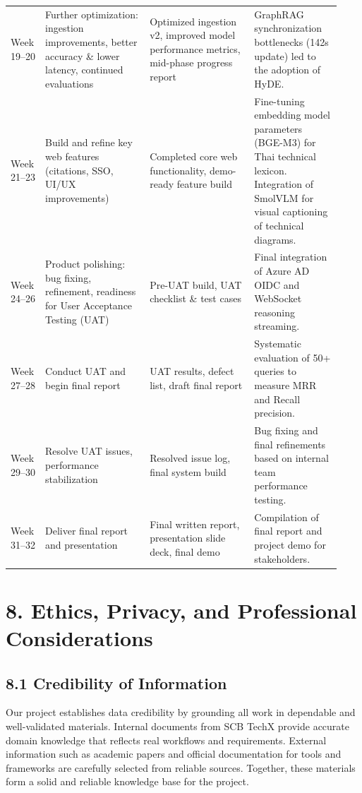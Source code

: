 \documentclass[12pt]{article}
\begin{document}
\begin{longtable}{p{0.08\linewidth} p{0.30\linewidth} p{0.30\linewidth} p{0.25\linewidth}}
Week 19--20 & Further optimization: ingestion improvements, better accuracy \& lower latency, continued evaluations & Optimized ingestion v2, improved model performance metrics, mid-phase progress report & GraphRAG synchronization bottlenecks (142s update) led to the adoption of HyDE. \\
Week 21--23 & Build and refine key web features (citations, SSO, UI/UX improvements) & Completed core web functionality, demo-ready feature build & Fine-tuning embedding model parameters (BGE-M3) for Thai technical lexicon. Integration of SmolVLM for visual captioning of technical diagrams. \\
Week 24--26 & Product polishing: bug fixing, refinement, readiness for User Acceptance Testing (UAT) & Pre-UAT build, UAT checklist \& test cases & Final integration of Azure AD OIDC and WebSocket reasoning streaming. \\
Week 27--28 & Conduct UAT and begin final report & UAT results, defect list, draft final report & Systematic evaluation of 50+ queries to measure MRR and Recall precision. \\
Week 29--30 & Resolve UAT issues, performance stabilization & Resolved issue log, final system build & Bug fixing and final refinements based on internal team performance testing. \\
Week 31--32 & Deliver final report and presentation & Final written report, presentation slide deck, final demo & Compilation of final report and project demo for stakeholders. \\
\bottomrule
\end{longtable}

\newpage
\section{8. Ethics, Privacy, and Professional Considerations}

\subsection{8.1 Credibility of Information}
Our project establishes data credibility by grounding all work in dependable and well-validated materials. Internal documents from SCB TechX provide accurate domain knowledge that reflects real workflows and requirements. External information such as academic papers and official documentation for tools and frameworks are carefully selected from reliable sources. Together, these materials form a solid and reliable knowledge base for the project.
\end{document}
